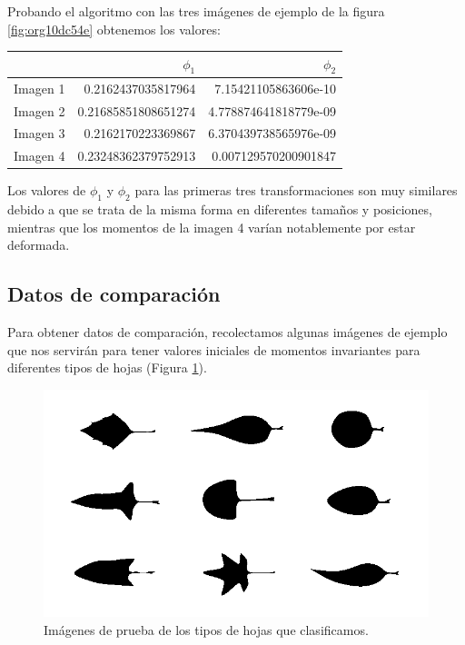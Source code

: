 \documentclass[letter]{article}
\begin{document}
Probando el algoritmo con las tres imágenes de ejemplo de la figura \ref{fig:org10dc54e} obtenemos
los valores:

\begin{center}
\begin{tabular}{lrr}
 & \(\phi_1\) & \(\phi_2\)\\
\hline
Imagen 1 & 0.2162437035817964 & 7.15421105863606e-10\\
Imagen 2 & 0.21685851808651274 & 4.778874641818779e-09\\
Imagen 3 & 0.2162170223369867 & 6.370439738565976e-09\\
Imagen 4 & 0.23248362379752913 & 0.007129570200901847\\
\end{tabular}
\end{center}

Los valores de \(\phi_1\) y \(\phi_2\) para las primeras tres transformaciones son
muy similares debido a que se trata de la misma forma en diferentes tamaños y
posiciones, mientras que los momentos de la imagen 4 varían notablemente por
estar deformada.

\subsection{Datos de comparación}
\label{sec:orgef044bb}
Para obtener datos de comparación, recolectamos algunas imágenes de ejemplo que
nos servirán para tener valores iniciales de momentos invariantes para
diferentes tipos de hojas (Figura \ref{fig:org8326242}).

\begin{figure}[htbp]
\centering
\includegraphics[width=.9\linewidth]{./images/leaves.png}
\caption{\label{fig:org8326242}Imágenes de prueba de los tipos de hojas que clasificamos.}
\end{figure}
\end{document}
